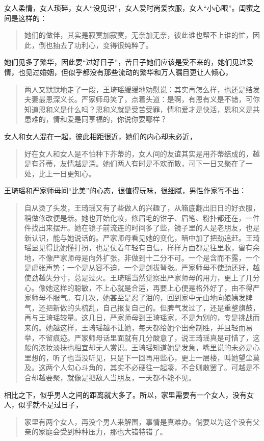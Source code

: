 女人柔情，女人琐碎，女人“没见识”，女人爱时尚爱衣服，女人“小心眼”。闺蜜之间是这样的：
\begin{quotation}
她们的做伴，其实是寂寞加寂寞，无奈加无奈，彼此谁也帮不上谁的忙，因此，倒也抽去了功利心，变得很纯粹了。
\end{quotation}
她们见多了繁华，因此要“过好日子”，苦日子她们应该是受不来的，她们见过爱情，也见过婚姻，但似乎都没有那些流动的繁华和万人瞩目更让人倾心，
\begin{quotation}
两人又默默地走了一段，王琦瑶缓缓地劝慰说：其实再怎么样，也还是结发夫妻最恩深义长。严家师母笑了，点着头道：是啊，有恩有义是不错，可你知道恩和义是什么吗？恩和义就是受苦受罪，情和爱才是快活，恩和义是共患难的，情和爱是同享福的，你说你要哪样？
\end{quotation}
女人和女人混在一起，彼此相距很近，她们的内心却未必近，
\begin{quotation}
好在女人和女人是不怕种下芥蒂的，女人间的友谊其实是用芥蒂结成的，越是有芥蒂，友情越是深。她们两人有时是不欢而散，可下一日又聚在了一处，比上一日更知心。
\end{quotation}
王琦瑶和严家师母间“比美”的心态，很值得玩味，很细腻，男性作家写不出：
\begin{quotation}
自从烫了头发，王琦瑶又有了些做人的兴趣了，从箱底翻出旧日的好衣服，稍做修改便是新。她也开始化妆，修眉毛的钳子、眉笔、粉扑都还在，一件件找出来摆开。她在镜子前流连的时间多了些，镜子里的人是老朋友，也是新认识，能与她说话的。严家师母看见她的变化，暗中加了把劲追赶。王琦瑶显见得比她懂打扮，也是仗着年轻有自信，样样方面都是往里收，留有余地，不像严家师母是向外扩张，非做到十二分不可。一个是含而不露，一个是虚张声势；一个是从容不迫，一个是剑拔弩张。严家师母不使劲还好，越使劲越失分寸，总是过火。王琦瑶当然觉察出严家师母的用力，更上了几分心。像她这样的聪敏，不上心就是合适，再要上心便是格外好了，由不得严家师母不服气。有几次，她甚至是忍了泪的，回到家中无由地向娘姨发脾气，还把新做的头梳乱，自己报复自己的。但脾气发过了，还是重整旗鼓，再与王琦瑶较量。这几日，严家师母到王琦瑶家，不是为别的，专是挑战而来的。她越这样，王琦瑶越不让她，每天都给她个出奇制胜，并且轻而易举，不留痕迹。严家师母话里面就有几分酸意了，说王琦瑶真是可惜了，这般的浓妆淡抹也相宜却无人赏识。王琦瑶知道她是发急，嘴里说的未必是心里想的，听了也当没听见，只是下一回再用些心，更上一层楼，叫她望尘莫及。这两个人勾心斗角的，其实不必硬往一起凑，不合则散罢了。可越是不合却越要聚，就像是把敌人当朋友，一天都不能不见。
\end{quotation}
相比之下，似乎男人之间的距离就大多了。所以，家里需要有一个女人，没有女人，似乎就不是过日子，
\begin{quotation}
家里有两个女人，再没个男人来解围，事情是真难办。倘要以为这个没有父亲的家庭会受到种种压力，那也大错特错了。
\end{quotation}

